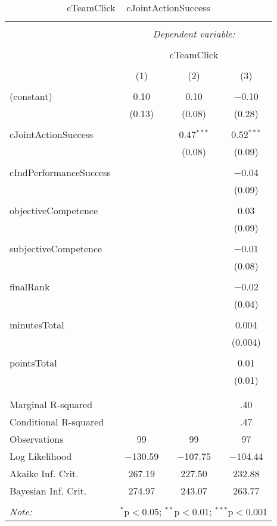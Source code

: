 
\begin{table}[!htbp] \centering 
  \caption{cTeamClick ~ cJointActionSuccess} 
  \label{tab:MLM21aJointActionSuccesscClick} 
\begin{tabular}{@{\extracolsep{5pt}}lccc} 
\\[-1.8ex]\hline 
\hline \\[-1.8ex] 
 & \multicolumn{3}{c}{\textit{Dependent variable:}} \\ 
\cline{2-4} 
\\[-1.8ex] & \multicolumn{3}{c}{cTeamClick} \\ 
\\[-1.8ex] & (1) & (2) & (3)\\ 
\hline \\[-1.8ex] 
 (constant) & 0.10 & 0.10 & $-$0.10 \\ 
  & (0.13) & (0.08) & (0.28) \\ 
  & & & \\ 
 cJointActionSuccess &  & 0.47$^{***}$ & 0.52$^{***}$ \\ 
  &  & (0.08) & (0.09) \\ 
  & & & \\ 
 cIndPerformanceSuccess &  &  & $-$0.04 \\ 
  &  &  & (0.09) \\ 
  & & & \\ 
 objectiveCompetence &  &  & 0.03 \\ 
  &  &  & (0.09) \\ 
  & & & \\ 
 subjectiveCompetence &  &  & $-$0.01 \\ 
  &  &  & (0.08) \\ 
  & & & \\ 
 finalRank &  &  & $-$0.02 \\ 
  &  &  & (0.04) \\ 
  & & & \\ 
 minutesTotal &  &  & 0.004 \\ 
  &  &  & (0.004) \\ 
  & & & \\ 
 pointsTotal &  &  & 0.01 \\ 
  &  &  & (0.01) \\ 
  & & & \\ 
\hline \\[-1.8ex] 
Marginal R-squared &  &  & .40 \\ 
Conditional R-squared &  &  & .47 \\ 
Observations & 99 & 99 & 97 \\ 
Log Likelihood & $-$130.59 & $-$107.75 & $-$104.44 \\ 
Akaike Inf. Crit. & 267.19 & 227.50 & 232.88 \\ 
Bayesian Inf. Crit. & 274.97 & 243.07 & 263.77 \\ 
\hline 
\hline \\[-1.8ex] 
\textit{Note:}  & \multicolumn{3}{r}{$^{*}$p$<$0.05; $^{**}$p$<$0.01; $^{***}$p$<$0.001} \\ 
\end{tabular} 
\end{table} 
